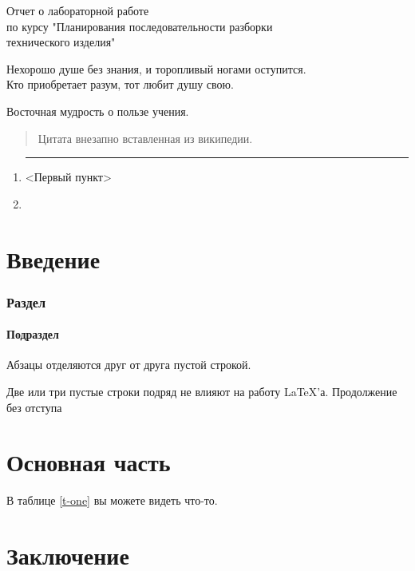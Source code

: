 \documentclass{article}
\begin{document}
\author{Жучков А.}
\begin{center}
Отчет о лабораторной работе \\
по курсу "Планирования последовательности разборки \\ 
технического изделия"
\end{center}

\begin{flushleft}
Нехорошо \hspace{2cm} душе без знания, и торопливый ногами оступится.\\
Кто приобретает разум, тот любит душу свою.
\end{flushleft}

\raggedleft Восточная мудрость о пользе учения.
\begin{quotation}
Цитата внезапно вставленная из википедии.
\end{quotation}
\begin{enumerate}
\item {\rule[+4mm]{10cm}{.1mm} <Первый пункт>}
\item <Последний пункт>
\end{enumerate}
\tableofcontents
\listoftables
\part{Введение}

\section*{Раздел}
\subsection*{Подраздел}
\par Абзацы отделяются друг от друга пустой строкой.

Две или три пустые строки подряд не влияют на работу \LaTeX’а.
Продолжение без отступа

\part{Основная часть}
\par В таблице \ref{t-one} вы можете видеть что-то.
\begin{table} [h]
<тело таблицы>
\caption{Стандартные размеры шрифтов в \LaTeX’е.} \label{t-one}
\end{table}

\part{Заключение}
\end{document}
